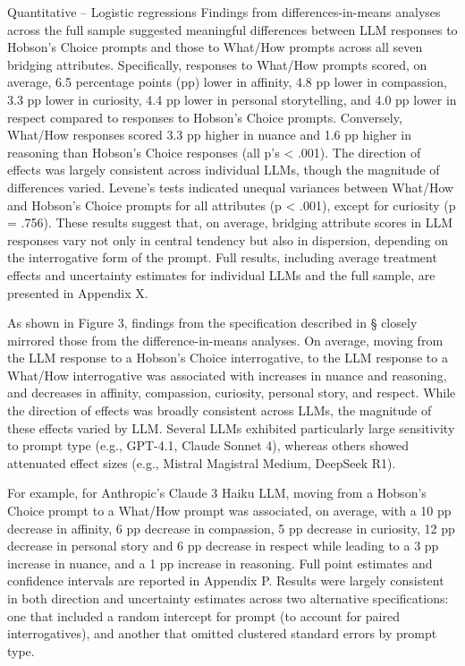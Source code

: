 \documentclass[
  12pt,
]{article}
\begin{document}
Quantitative -- Logistic regressions
Findings from differences-in-means analyses across the full sample suggested meaningful differences between LLM responses to Hobson's Choice prompts and those to What/How prompts across all seven bridging attributes. Specifically, responses to What/How prompts scored, on average, 6.5 percentage points (pp) lower in affinity, 4.8 pp lower in compassion, 3.3 pp lower in curiosity, 4.4 pp lower in personal storytelling, and 4.0 pp lower in respect compared to responses to Hobson's Choice prompts. Conversely, What/How responses scored 3.3 pp higher in nuance and 1.6 pp higher in reasoning than Hobson's Choice responses (all p's \textless{} .001). The direction of effects was largely consistent across individual LLMs, though the magnitude of differences varied. Levene's tests indicated unequal variances between What/How and Hobson's Choice prompts for all attributes (p \textless{} .001), except for curiosity (p = .756). These results suggest that, on average, bridging attribute scores in LLM responses vary not only in central tendency but also in dispersion, depending on the interrogative form of the prompt. Full results, including average treatment effects and uncertainty estimates for individual LLMs and the full sample, are presented in Appendix X.

As shown in Figure 3, findings from the specification described in § closely mirrored those from the difference-in-means analyses. On average, moving from the LLM response to a Hobson's Choice interrogative, to the LLM response to a What/How interrogative was associated with increases in nuance and reasoning, and decreases in affinity, compassion, curiosity, personal story, and respect. While the direction of effects was broadly consistent across LLMs, the magnitude of these effects varied by LLM. Several LLMs exhibited particularly large sensitivity to prompt type (e.g., GPT-4.1, Claude Sonnet 4), whereas others showed attenuated effect sizes (e.g., Mistral Magistral Medium, DeepSeek R1).

For example, for Anthropic's Claude 3 Haiku LLM, moving from a Hobson's Choice prompt to a What/How prompt was associated, on average, with a 10 pp decrease in affinity, 6 pp decrease in compassion, 5 pp decrease in curiosity, 12 pp decrease in personal story and 6 pp decrease in respect while leading to a 3 pp increase in nuance, and a 1 pp increase in reasoning. Full point estimates and confidence intervals are reported in Appendix P. Results were largely consistent in both direction and uncertainty estimates across two alternative specifications: one that included a random intercept for prompt (to account for paired interrogatives), and another that omitted clustered standard errors by prompt type.
\end{document}
